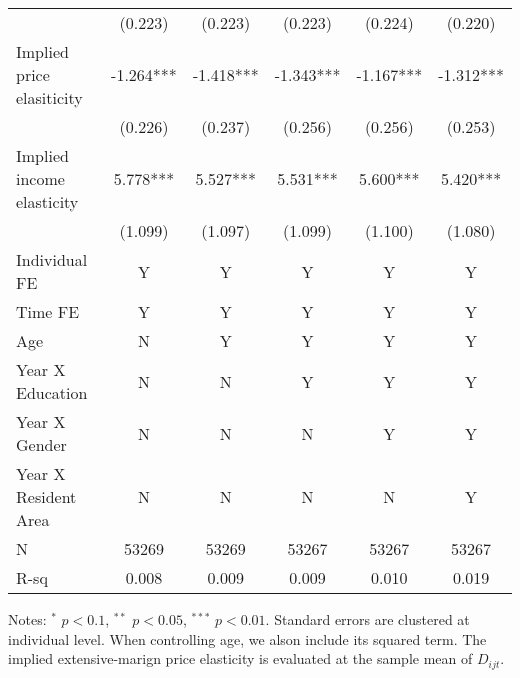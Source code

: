 \documentclass[ review  , 3p ]{elsarticle}
\begin{document}
\begin{table}
\begin{threeparttable}
\begin{tabular}[t]{lccccc}
  \hspace{1em} & (0.223) & (0.223) & (0.223) & (0.224) & (0.220)\\
  \hspace{1em}Implied price elasiticity & -1.264*** & -1.418*** & -1.343*** & -1.167*** & -1.312***\\
  \hspace{1em} & (0.226) & (0.237) & (0.256) & (0.256) & (0.253)\\
  \hspace{1em}Implied income elasticity & 5.778*** & 5.527*** & 5.531*** & 5.600*** & 5.420***\\
  \hspace{1em} & (1.099) & (1.097) & (1.099) & (1.100) & (1.080)\\
  \hspace{1em}Individual FE & Y & Y & Y & Y & Y\\
  \hspace{1em}Time FE & Y & Y & Y & Y & Y\\
  \hspace{1em}Age & N & Y & Y & Y & Y\\
  \hspace{1em}Year X Education & N & N & Y & Y & Y\\
  \hspace{1em}Year X Gender & N & N & N & Y & Y\\
  \hspace{1em}Year X Resident Area & N & N & N & N & Y\\
  \hspace{1em}N & 53269 & 53269 & 53267 & 53267 & 53267\\
  \hspace{1em}R-sq & 0.008 & 0.009 & 0.009 & 0.010 & 0.019\\
  \bottomrule
  \end{tabular}
  \begin{tablenotes}
  \item Notes: $^{*}$ $p < 0.1$, $^{**}$ $p < 0.05$, $^{***}$ $p < 0.01$. Standard errors are clustered at individual level. When controlling age, we alson include its squared term. The implied extensive-marign price elasticity is evaluated at the sample mean of $D_{ijt}$.
  \end{tablenotes}
  \end{threeparttable}
  \end{table}
  
\end{document}
